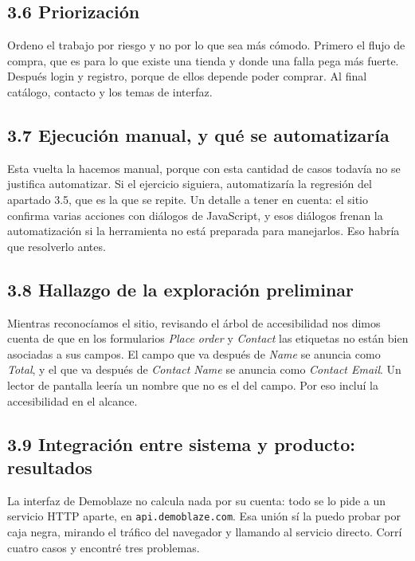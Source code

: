 \documentclass[11pt,a4paper]{article}
\begin{document}
\subsection*{3.6 Priorización}

Ordeno el trabajo por riesgo y no por lo que sea más cómodo. Primero el flujo de
compra, que es para lo que existe una tienda y donde una falla pega más fuerte.
Después login y registro, porque de ellos depende poder comprar. Al final catálogo,
contacto y los temas de interfaz.

\subsection*{3.7 Ejecución manual, y qué se automatizaría}

Esta vuelta la hacemos manual, porque con esta cantidad de casos todavía no se
justifica automatizar. Si el ejercicio siguiera, automatizaría
la regresión del apartado 3.5, que es la que se repite. Un detalle a tener en
cuenta: el sitio confirma varias acciones con diálogos de JavaScript, y esos
diálogos frenan la automatización si la herramienta no está preparada para
manejarlos. Eso habría que resolverlo antes.

\subsection*{3.8 Hallazgo de la exploración preliminar}

Mientras reconocíamos el sitio, revisando el árbol de accesibilidad nos dimos cuenta de que
en los formularios \emph{Place order} y \emph{Contact} las etiquetas no están bien
asociadas a sus campos. El campo que va después de \emph{Name} se anuncia como
\emph{Total}, y el que va después de \emph{Contact Name} se anuncia como
\emph{Contact Email}. Un lector de pantalla leería un nombre que no es el del campo.
Por eso incluí la accesibilidad en el alcance.

\subsection*{3.9 Integración entre sistema y producto: resultados}

La interfaz de Demoblaze no calcula nada por su cuenta: todo se lo pide a un servicio
HTTP aparte, en \texttt{api.demoblaze.com}. Esa unión sí la puedo probar por caja
negra, mirando el tráfico del navegador y llamando al servicio directo. Corrí cuatro
casos y encontré tres problemas.
\end{document}
